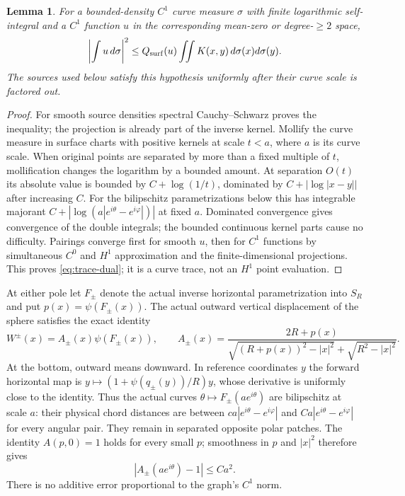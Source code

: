 \documentclass[11pt]{article}
\newtheorem{lemma}[theorem]{Lemma}
\theoremstyle{remark}\newtheorem{remark}[theorem]{Remark}
\numberwithin{equation}{section}
\begin{document}
\begin{lemma}\label{lem:curve-trace}
For a bounded-density $C^1$ curve measure $\sigma$ with finite logarithmic
self-integral and a $C^1$ function $u$ in the corresponding mean-zero
or degree-$\geq2$ space,
\begin{equation}
 \left|\int u\,d\sigma\right|^2
 \leq Q_{\rm surf}(u)\iint K(x,y)\,d\sigma(x)d\sigma(y).
 \label{eq:trace-dual}
\end{equation}
The sources used below satisfy this hypothesis uniformly after their
curve scale is factored out.
\end{lemma}
\begin{proof}
For smooth source densities spectral Cauchy--Schwarz proves the inequality;
the projection is already part of the inverse kernel. Mollify the curve
measure in surface charts with positive kernels at scale $t<a$, where
$a$ is its curve scale. When original points are separated by more than
a fixed multiple of $t$, mollification changes the logarithm by a bounded
amount. At separation $O(t)$ its absolute value is bounded by
$C+\log(1/t)$, dominated by $C+|\log|x-y||$ after increasing $C$.
For the bilipschitz parametrizations below this has integrable majorant
$C+|\log(a|e^{i\theta}-e^{i\varphi}|)|$ at fixed $a$.
Dominated convergence gives convergence of the double integrals; the
bounded continuous kernel parts cause no difficulty. Pairings converge
first for smooth $u$, then for $C^1$ functions by simultaneous $C^0$
and $H^1$ approximation and the finite-dimensional projections.
This proves \eqref{eq:trace-dual}; it is a curve trace, not an $H^1$
point evaluation.
\end{proof}

At either pole let $F_\pm$ denote the actual inverse horizontal
parametrization into $S_R$ and put $p(x)=\psi(F_\pm(x))$.
The actual outward vertical displacement of the sphere satisfies the
exact identity
\begin{equation}
 W^\pm(x)=A_\pm(x)\psi(F_\pm(x)),\qquad
 A_\pm(x)=\frac{2R+p(x)}{
 \sqrt{(R+p(x))^2-|x|^2}+\sqrt{R^2-|x|^2}}.\label{eq:actual}
\end{equation}
At the bottom, outward means downward. In reference coordinates $y$ the
forward horizontal map is $y\mapsto(1+\psi(q_\pm(y))/R)y$, whose
derivative is uniformly close to the identity. Thus the actual curves
$\theta\mapsto F_\pm(ae^{i\theta})$ are bilipschitz at scale $a$:
their physical chord distances are between
$ca|e^{i\theta}-e^{i\varphi}|$ and
$Ca|e^{i\theta}-e^{i\varphi}|$ for every angular pair.
They remain in separated opposite polar patches. The identity
$A(p,0)=1$ holds for every small $p$; smoothness in $p$ and $|x|^2$
therefore gives
\begin{equation}
 |A_\pm(ae^{i\theta})-1|\leq Ca^2.\label{eq:weight}
\end{equation}
There is no additive error proportional to the graph's $C^1$ norm.
\end{document}
